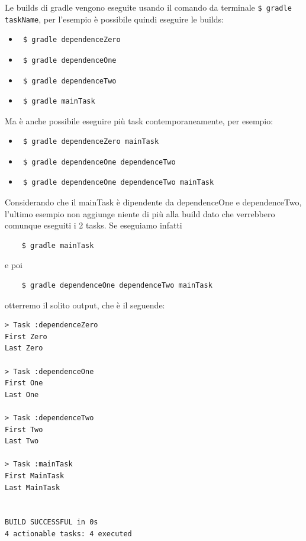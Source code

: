 Le builds di gradle vengono eseguite usando il comando da terminale \texttt{\$ gradle taskName}, per l'esempio è possibile quindi eseguire le builds:
\begin{itemize}
    \item \begin{verbatim} $ gradle dependenceZero \end{verbatim}
    \item \begin{verbatim} $ gradle dependenceOne \end{verbatim}
    \item \begin{verbatim} $ gradle dependenceTwo \end{verbatim}
    \item \begin{verbatim} $ gradle mainTask \end{verbatim}
\end{itemize}
Ma è anche possibile eseguire più task contemporaneamente, per esempio:
\begin{itemize}
    \item \begin{verbatim} $ gradle dependenceZero mainTask\end{verbatim}
    \item \begin{verbatim} $ gradle dependenceOne dependenceTwo \end{verbatim}
    \item \begin{verbatim} $ gradle dependenceOne dependenceTwo mainTask\end{verbatim}
\end{itemize}
Considerando che il mainTask è dipendente da dependenceOne e dependenceTwo, l'ultimo esempio non aggiunge niente di più alla build dato che verrebbero comunque eseguiti i 2 tasks. Se eseguiamo infatti
\begin{verbatim}
    $ gradle mainTask \end{verbatim} 
e poi 
\begin{verbatim}
    $ gradle dependenceOne dependenceTwo mainTask \end{verbatim}
otterremo il solito output, che è il seguende:
\label{outMainTask}
\begin{verbatim}
> Task :dependenceZero 
First Zero
Last Zero

> Task :dependenceOne 
First One
Last One

> Task :dependenceTwo 
First Two
Last Two

> Task :mainTask 
First MainTask
Last MainTask


BUILD SUCCESSFUL in 0s
4 actionable tasks: 4 executed\end{verbatim} 
